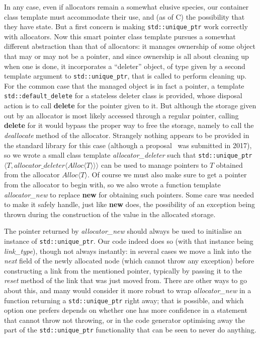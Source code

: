 \documentclass[12pt]{article}
\theoremstyle{plain}
\theoremstyle{definition}
\def\PP{\copy\PPbox}
\newcommand\Cee{\textsc{C}}
\newcommand\Cpp{\Cee\PP}
\newcommand\std[1]{\texttt{std::#1}}
\def\uptr.{\std{unique\_ptr}}
\def\ang#1{\langle#1\rangle}
\begin{document}
In any case, even if allocators remain a somewhat elusive species, our container
class template must accommodate their use, and (as of \Cpp11) the possibility
that they have state. But a first concern is making \uptr. work correctly with
allocators. Now this smart pointer class template pursues a somewhat different
abstraction than that of allocators: it manages ownership of some object that
may or may not be a pointer, and since ownership is all about cleaning up when
one is done, it incorporates a ``deleter'' object, of type given by a second
template argument to \uptr., that is called to perform cleaning up. For the
common case that the managed object is in fact a pointer, a template
\std{default\_delete} for a stateless deleter class is provided, whose disposal
action is to call \textbf{delete} for the pointer given to it. But although the
storage given out by an allocator is most likely accessed through a regular
pointer, calling \textbf{delete} for it would bypass the proper way to free the
storage, namely to call the \textit{deallocate} method of the allocator.
Strangely nothing appears to be provided in the standard library for this case
(although a proposal~\cite{P0316R0} was submitted in 2017), so we wrote a small
class template \textit{allocator\_deleter} such that
\uptr.$\ang{T,\textit{allocator\_deleter}\ang{\textit{Alloc}\ang T}}$ can be
used to manage pointers to $T$ obtained from the allocator $\textit{Alloc}\ang
T$. Of course we must also make sure to get a pointer from the allocator to
begin with, so we also wrote a function template \textit{allocator\_new} to
replace \textbf{new} for obtaining such pointers. Some care was needed to make
it safely handle, just like \textbf{new} does, the possibility of an exception
being thrown during the construction of the value in the allocated storage.

The pointer returned by \textit{allocator\_new} should always be used to
initialise an instance of \uptr.. Our code indeed does so (with that instance
being \textit{link\_type}), though not always instantly: in several cases we
move a link into the \textit{next} field of the newly allocated node (which
cannot throw any exception) before constructing a link from the mentioned
pointer, typically by passing it to the \textit{reset} method of the link that
was just moved from. There are other ways to go about this, and many would
consider it more robust to wrap \textit{allocator\_new} in a function returning
a \uptr. right away; that is possible, and which option one prefers depends on
whether one has more confidence in a statement that cannot throw not throwing,
or in the code generator optimising away the part of the \uptr. functionality
that can be seen to never do anything.
\end{document}
